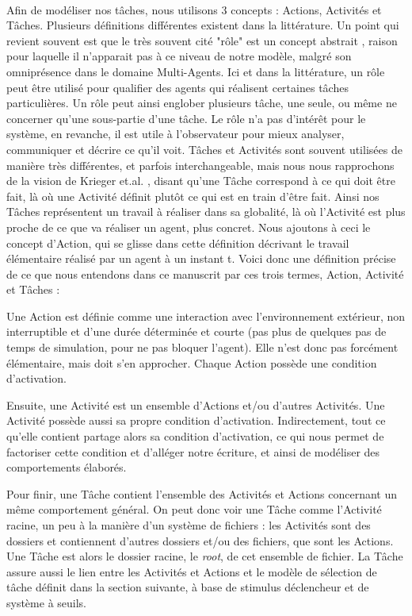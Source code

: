 		\paragraph{}
			Afin de modéliser nos tâches, nous utilisons 3 concepts : Actions, Activités et Tâches. Plusieurs définitions différentes existent dans la littérature. Un point qui revient souvent est que le très souvent cité "rôle" est un concept abstrait \cite{ferber_eta-model_1998, wooldridge_methodology_1999, campbell_multi-agent_2011}, raison pour laquelle il n'apparait pas à ce niveau de notre modèle, malgré son omniprésence dans le domaine Multi-Agents. Ici et dans la littérature, un rôle peut être utilisé pour qualifier des agents qui réalisent certaines tâches particulières. Un rôle peut ainsi englober plusieurs tâche, une seule, ou même ne concerner qu'une sous-partie d'une tâche. Le rôle n'a pas d'intérêt pour le système, en revanche, il est utile à l'observateur pour mieux analyser, communiquer et décrire ce qu'il voit. Tâches et Activités sont souvent utilisées de manière très différentes, et parfois interchangeable, mais nous nous rapprochons de la vision de Krieger et.al. \cite{krieger_call_2000}, disant qu'une Tâche correspond à ce qui doit être fait, là où une Activité définit plutôt ce qui est en train d'être fait. Ainsi nos Tâches représentent un travail à réaliser dans sa globalité, là où l'Activité est plus proche de ce que va réaliser un agent, plus concret. Nous ajoutons à ceci le concept d'Action, qui se glisse dans cette définition décrivant le travail élémentaire réalisé par un agent à un instant t. Voici donc une définition précise de ce que nous entendons dans ce manuscrit par ces trois termes, Action, Activité et Tâches :
			
			Une Action est définie comme une interaction avec l'environnement extérieur, non interruptible et d'une durée déterminée et courte (pas plus de quelques pas de temps de simulation, pour ne pas bloquer l'agent). Elle n'est donc pas forcément élémentaire, mais doit s'en approcher. Chaque Action possède une condition d'activation.
			
			Ensuite, une Activité est un ensemble d'Actions et/ou d'autres Activités. Une Activité possède aussi sa propre condition d'activation. Indirectement, tout ce qu'elle contient partage alors sa condition d'activation, ce qui nous permet de factoriser cette condition et d'alléger notre écriture, et ainsi de modéliser des comportements élaborés.
			
			Pour finir, une Tâche contient l'ensemble des Activités et Actions concernant un même comportement général. On peut donc voir une Tâche comme l'Activité racine, un peu à la manière d'un système de fichiers : les Activités sont des dossiers et contiennent d'autres dossiers et/ou des fichiers, que sont les Actions. Une Tâche est alors le dossier racine, le \textit{root}, de cet ensemble de fichier. La Tâche assure aussi le lien entre les Activités et Actions et le modèle de sélection de tâche définit dans la section suivante, à base de stimulus déclencheur et de système à seuils.
			
